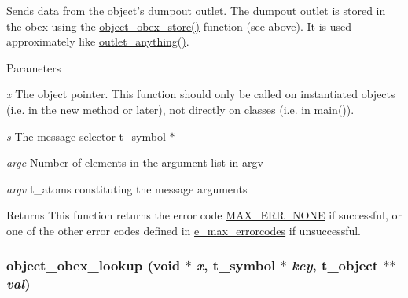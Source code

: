 Sends data from the object's dumpout outlet. The dumpout outlet is stored in the obex using the \hyperlink{group__obj_gaccdb93572405a2e9f065086f9c3dfe41}{object\_\-obex\_\-store()} function (see above). It is used approximately like \hyperlink{group__inout_ga12798ee897e01dac21ee547c4091d8a8}{outlet\_\-anything()}.


\begin{DoxyParams}{Parameters}
\item[{\em x}]The object pointer. This function should only be called on instantiated objects (i.e. in the {\ttfamily new} method or later), not directly on classes (i.e. in {\ttfamily main()}). \item[{\em s}]The message selector \hyperlink{structt__symbol}{t\_\-symbol} $\ast$ \item[{\em argc}]Number of elements in the argument list in argv \item[{\em argv}]t\_\-atoms constituting the message arguments\end{DoxyParams}
\begin{DoxyReturn}{Returns}
This function returns the error code \hyperlink{group__misc_gga0764dd6c02b76cca7d053ae50555d69da6d22f77fef8b1e1b074cef5d29d935fd}{MAX\_\-ERR\_\-NONE} if successful, or one of the other error codes defined in \hyperlink{group__misc_ga0764dd6c02b76cca7d053ae50555d69d}{e\_\-max\_\-errorcodes} if unsuccessful. 
\end{DoxyReturn}
\hypertarget{group__obj_gaba3a848eba4f4b834c1f89377c75e281}{
\subsubsection[{object\_\-obex\_\-lookup}]{ object\_\-obex\_\-lookup (void $\ast$ {\em x}, \/  {\bf t\_\-symbol} $\ast$ {\em key}, \/  {\bf t\_\-object} $\ast$$\ast$ {\em val})}}
\label{group__obj_gaba3a848eba4f4b834c1f89377c75e281}


